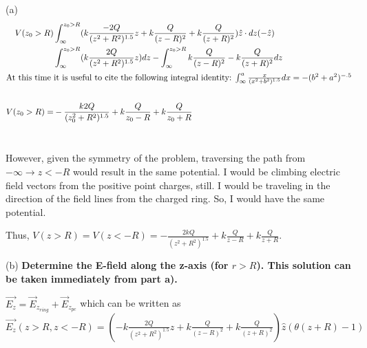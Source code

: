 \begin{homeworkProblem}
\begin{homeworkSection}{(a)}
\begin{align}
V(z_0>R)&\int_\infty^{z_0>R} (k \frac{-2Q}{(z^2+R^2)^{1.5}}z + k \frac{Q}{(z-R)^2}+ k \frac{Q}{(z+R)^2} ) \hat{z} \cdot dz (-\hat{z}) \nonumber \\
&\int_\infty^{z_0>R}  (k \frac{2Q}{(z^2+R^2)^{1.5}}z) dz - \int_\infty^{z_0>R} k \frac{Q}{(z-R)^2} - k \frac{Q}{(z+R)^2} dz \nonumber \\
\intertext{At this time it is useful to cite the following integral identity: $\int_\infty^a \frac{x}{(x^2+b^2)^{1.5}}dx = -(b^2+a^2)^{-.5}$} \nonumber \\
V(z_0>R) = &-\frac{k2Q}{(z_0^2+R^2)^{1.5}} + k\frac{Q}{z_0-R} + k\frac{Q}{z_0+R} \nonumber
\end{align}
\\ \par
However, given the symmetry of the problem, traversing the path from $-\infty \rightarrow z < -R$ would result in the same potential. I would be climbing electric field vectors from the positive point charges, still. I would be traveling in the direction of the field lines from the charged ring. So, I would have the same potential.
\\ \par
Thus, $V(z>R) = V(z<-R) = -\frac{2kQ}{(z^2+R^2)^{1.5}} + k\frac{Q}{z-R} + k\frac{Q}{z+R}$.


\end{homeworkSection}

\begin{homeworkSection}{(b)}
\textbf{Determine the E-field along the z-axis (for $r>R$). This solution can be taken immediately from part a).}
\\ \par
 $\vec{E_z} = \vec{E}_{z_{ring}} + \vec{E}_{z_{pc}}$ which can be written as $\vec{E_z}(z>R,z<-R) = (-k \frac{2Q}{(z^2+R^2)^{1.5}}z + k \frac{Q}{(z-R)^2} + k \frac{Q}{(z+R)^2} ) \hat{z} (\theta(z+R)-1)$

\end{homeworkSection}


\end{homeworkProblem}
